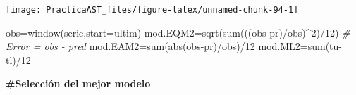 \documentclass[
]{article}
\newenvironment{Shaded}{\begin{snugshade}}{\end{snugshade}}
\newcommand{\AttributeTok}[1]{\textcolor[rgb]{0.77,0.63,0.00}{#1}}
\newcommand{\CommentTok}[1]{\textcolor[rgb]{0.56,0.35,0.01}{\textit{#1}}}
\newcommand{\DecValTok}[1]{\textcolor[rgb]{0.00,0.00,0.81}{#1}}
\newcommand{\FunctionTok}[1]{\textcolor[rgb]{0.00,0.00,0.00}{#1}}
\newcommand{\NormalTok}[1]{#1}
\newcommand{\OtherTok}[1]{\textcolor[rgb]{0.56,0.35,0.01}{#1}}
\newcommand{\SpecialCharTok}[1]{\textcolor[rgb]{0.00,0.00,0.00}{#1}}
\begin{document}
\begin{center}\texttt{[image: PracticaAST\_files/figure-latex/unnamed-chunk-94-1]} \end{center}

\begin{Shaded}
\begin{Highlighting}[]
\NormalTok{obs}\OtherTok{=}\FunctionTok{window}\NormalTok{(serie,}\AttributeTok{start=}\NormalTok{ultim)}
\NormalTok{mod.EQM2}\OtherTok{=}\FunctionTok{sqrt}\NormalTok{(}\FunctionTok{sum}\NormalTok{(((obs}\SpecialCharTok{{-}}\NormalTok{pr)}\SpecialCharTok{/}\NormalTok{obs)}\SpecialCharTok{\^{}}\DecValTok{2}\NormalTok{)}\SpecialCharTok{/}\DecValTok{12}\NormalTok{)   }\CommentTok{\# Error = obs {-} pred}
\NormalTok{mod.EAM2}\OtherTok{=}\FunctionTok{sum}\NormalTok{(}\FunctionTok{abs}\NormalTok{(obs}\SpecialCharTok{{-}}\NormalTok{pr)}\SpecialCharTok{/}\NormalTok{obs)}\SpecialCharTok{/}\DecValTok{12}
\NormalTok{mod.ML2}\OtherTok{=}\FunctionTok{sum}\NormalTok{(tu}\SpecialCharTok{{-}}\NormalTok{tl)}\SpecialCharTok{/}\DecValTok{12}
\end{Highlighting}
\end{Shaded}

\textbf{\#Selección del mejor modelo}
\end{document}
